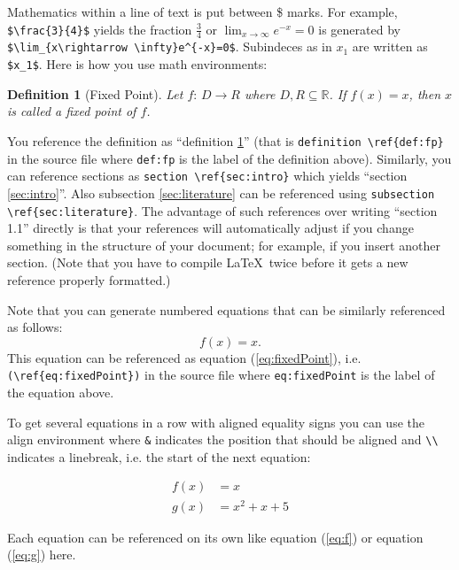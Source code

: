 \documentclass[12pt,a4paper]{article}
\newtheorem{definition}{Definition}
\begin{document}
Mathematics within a line of text is put between \$ marks. For example, \verb|$\frac{3}{4}$| yields the fraction $\frac{3}{4}$ or $\lim_{x\rightarrow \infty}e^{-x}=0$ is generated by\\ %
\verb|$\lim_{x\rightarrow \infty}e^{-x}=0$|. Subindeces as in $x_1$ are written as \verb|$x_1$|. Here is how you use math environments:

\begin{definition}[Fixed Point]\label{def:fp}
  Let $f: \,D\rightarrow R$ where $D,R\subseteq \mathbb{R}$. If $f(x)=x$, then $x$ is called a \emph{fixed point} of $f$.
\end{definition}

You reference the definition as ``definition \ref{def:fp}'' (that is \verb|definition \ref{def:fp}| in the source file where \verb|def:fp| is the label of the definition above). Similarly, you can reference sections as \verb|section \ref{sec:intro}| which yields ``section \ref{sec:intro}''. Also subsection \ref{sec:literature} can be referenced using \verb|subsection \ref{sec:literature}|. The advantage of such references over writing ``section 1.1'' directly is that your references will automatically adjust if you change something in the structure of your document; for example, if you insert another section.
(Note that you have to compile \LaTeX\ twice before it gets a new reference properly formatted.)

Note that you can generate numbered equations that can be similarly referenced as follows:
\begin{equation}
  \label{eq:fixedPoint}
  f(x)=x.
\end{equation}
This equation can be referenced as equation (\ref{eq:fixedPoint}), i.e. \verb|(\ref{eq:fixedPoint})| in the source file where \verb|eq:fixedPoint| is the label of the equation above.

To get several equations in a row with aligned equality signs you can use the align environment where \verb|&| indicates the position that should be aligned and \verb|\\| indicates a linebreak, i.e. the start of the next equation:

\begin{align}
  f(x)&=x \label{eq:f} \\
  g(x)&=x^2+x+5     \label{eq:g}
\end{align}

Each equation can be referenced on its own like equation (\ref{eq:f}) or equation (\ref{eq:g}) here.
\end{document}

